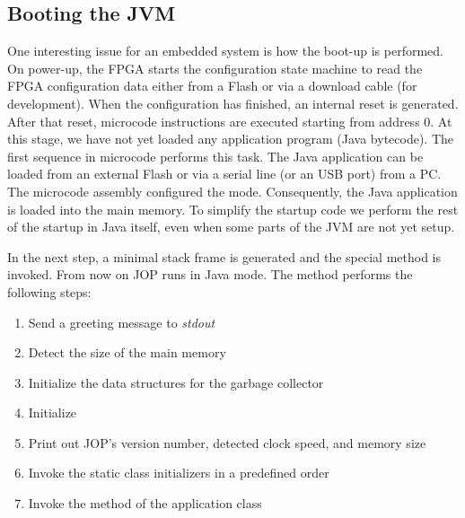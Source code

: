\subsection{Booting the JVM}


One interesting issue for an embedded system is how the boot-up is
performed. On power-up, the FPGA starts the configuration state
machine to read the FPGA configuration data either from a Flash or
via a download cable (for development). When the configuration has
finished, an internal reset is generated. After that reset, microcode
instructions are executed starting from address 0. At this stage, we
have not yet loaded any application program (Java bytecode). The
first sequence in microcode performs this task. The Java application
can be loaded from an external Flash or via a serial line (or an USB
port) from a PC. The microcode assembly configured the mode.
Consequently, the Java application is loaded into the main memory. To
simplify the startup code we perform the rest of the startup in Java
itself, even when some parts of the JVM are not yet setup.

In the next step, a minimal stack frame is generated and the special
method  is invoked. From now on JOP runs in
Java mode. The method  performs the following steps:
\begin{samepage}
\begin{enumerate}
    \item Send a greeting message to \emph{stdout}
    \item Detect the size of the main memory
    \item Initialize the data structures for the garbage collector
    \item Initialize 
    \item Print out JOP's version number, detected clock speed, and
    memory size
    \item Invoke the static class initializers in a predefined order
    \item Invoke the  method of the application class
\end{enumerate}
\end{samepage}
